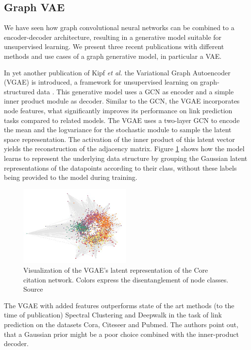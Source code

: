 \subsection{Graph VAE}
We have seen how graph convolutional neural networks can be combined to a encoder-decoder architecture, resulting in a generative model suitable for unsupervised learning. We present three recent publications with different methods and use cases of a graph generative model, in particular a VAE.

In yet another publication of Kipf \textit{et al.} the Variational Graph Autoencoder (VGAE) is introduced, a framework for unsupervised learning on graph-structured data \cite{kipf_variational_2016}. This generative model uses a GCN as encoder and a simple inner product module as decoder. Similar to the GCN, the VGAE incorporates node features, what significantly improves its performance on link prediction tasks compared to related models. The VGAE uses a two-layer GCN to encode the mean and the logvariance for the stochastic module to sample the latent space representation. The activation of the inner product of this latent vector yields the reconstruction of the adjacency matrix. Figure \ref{fig:kipfGVAE} shows how the model learns to represent the underlying data structure by grouping the Gaussian latent representations of the datapoints according to their class, without these labels being provided to the model during training.

\begin{figure}[h]
    \centering
    \includegraphics[width=0.5\textwidth]{data/images/KipGVAE.jpg}
    \caption{Visualization of the VGAE's latent representation of the Core citation network. Colors express the disentanglement of node classes. Source \cite{kipf_variational_2016}}
    \label{fig:kipfGVAE}
\end{figure}

The VGAE with added features outperforms state of the art methods (to the time of publication) Spectral Clustering \cite{tang2011leveraging} and Deepwalk \cite{perozzi2014deepwalk} in the task of link prediction on the datasets Cora, Citeseer and Pubmed. The authors point out, that a Gaussian prior might be a poor choice combined with the inner-product decoder.

